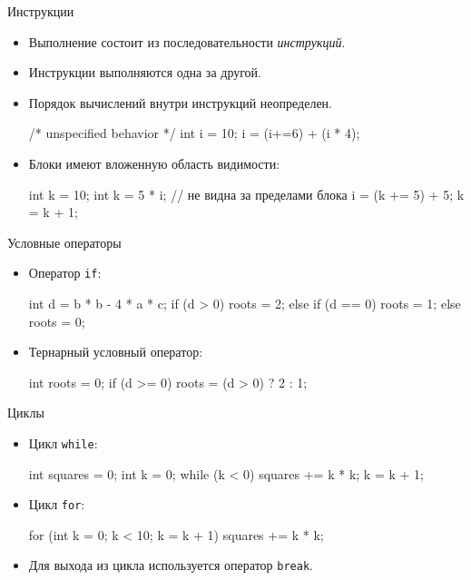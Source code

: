 \documentclass[
    9pt,
    hyperref={pdfencoding=unicode}
    ]{beamer}
\begin{document}
\begin{frame}[fragile]{Инструкции}
    \begin{itemize}
        \item Выполнение состоит из последовательности \emph{инструкций}.
        \item Инструкции выполняются одна за другой.
        \item Порядок вычислений внутри инструкций неопределен.
        \begin{cppcode}
            /* unspecified behavior */
            int i = 10;
            i = (i+=6) + (i * 4);
        \end{cppcode}
        \item Блоки имеют вложенную область видимости:
        \begin{cppcode}
            int k = 10;
            {
                int k = 5 * i; // не видна за пределами блока
                i = (k += 5) + 5;
            }
            k = k + 1;
        \end{cppcode}
    \end{itemize}    
\end{frame}

\begin{frame}[fragile]{Условные операторы}
    \begin{itemize}
        \item Оператор \texttt{if}:
        \begin{cppcode}
            int d = b * b - 4 * a * c;
            if (d > 0)
            {
                roots = 2;
            }
            else if (d == 0)
            {
                roots = 1;
            }
            else
            {
                roots = 0;
            }
        \end{cppcode}
        \item Тернарный условный оператор:
        \begin{cppcode}
            int roots = 0;
            if (d >= 0)
                roots = (d > 0) ? 2 : 1;
        \end{cppcode}
    \end{itemize}
\end{frame}

\begin{frame}[fragile]{Циклы}
    \begin{itemize}
        \item Цикл \texttt{while}:
        \begin{cppcode}
            int squares = 0;
            int k = 0;
            while (k < 0)
            {
                squares += k * k;
                k = k + 1;
            }
        \end{cppcode}
        \item Цикл \texttt{for}:
        \begin{cppcode}
            for (int k = 0; k < 10; k = k + 1)
            {
                squares += k * k;
            }
        \end{cppcode}
        \item Для выхода из цикла используется оператор \texttt{break}.
    \end{itemize}
\end{frame}
\end{document}
